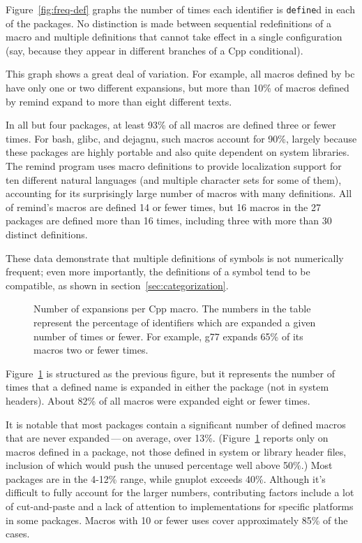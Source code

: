 \documentclass[11pt]{article}
\def\numpackages{27}
\newcommand{\pkg}[1]{\textsf{#1}}
\begin{document}
Figure~\ref{fig:freq-def} graphs the number of times each identifier is
{\tt define}d in each of the packages.  No distinction is made between
sequential redefinitions of a macro and multiple definitions that cannot
take effect in a single configuration (say, because they appear in
different branches of a Cpp conditional).

This graph shows a great deal of variation.  For example, all macros
defined by \pkg{bc} have only one or two different expansions, but more than 10\%
of macros defined by \pkg{remind} expand to more than eight different texts.

In all but four packages, at least 93\% of all macros are defined three or
fewer times.  For \pkg{bash}, \pkg{glibc}, and \pkg{dejagnu}, such macros account for 90\%,
largely because these packages are highly portable and also quite dependent
on system libraries.  The \pkg{remind} program uses macro definitions to provide
localization support for ten different natural languages (and multiple
character sets for some of them), accounting for its surprisingly large
number of macros with many definitions.  All of \pkg{remind}'s macros are defined
14 or fewer times, but 16 macros in the {\numpackages} packages are defined
more than 16 times, including three with more than 30 distinct definitions.

These data demonstrate that multiple definitions of symbols is not
numerically frequent; even more importantly, the definitions of a symbol
tend to be compatible, as shown in section~\ref{sec:categorization}.


\begin{figure}
\centerline{}
\caption{Number of expansions per Cpp macro.  The numbers in the
  table represent the percentage of identifiers which are expanded a given
  number of times or fewer.  For example, \pkg{g77} expands 65\% of its
  macros two or fewer times.}
\label{fig:freq-use}
\end{figure}

Figure~\ref{fig:freq-use} is structured as the previous figure, but it
represents the number of times that a defined name is expanded in either
the package (not in system headers).  About 82\% of all macros were
expanded eight or fewer times.

It is notable that most packages contain a significant number of defined
macros that are never expanded\,---\,on average, over 13\%.
(Figure~\ref{fig:freq-use} reports only on macros defined in a package, not
those defined in system or library header files, inclusion of which would
push the unused percentage well above 50\%.)  Most packages are in the
4-12\% range, while \pkg{gnuplot} exceeds 40\%.  Although it's difficult to fully
account for the larger numbers, contributing factors include a lot of
cut-and-paste and a lack of attention to implementations for specific
platforms in some packages.  Macros with 10 or fewer uses cover
approximately 85\% of the cases.
\end{document}
